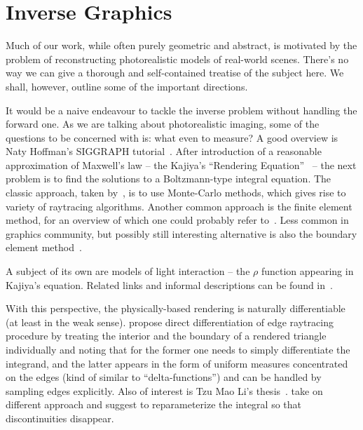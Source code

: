 \chapter{Inverse Graphics} \label{chap:graphics}

Much of our work, while often purely geometric and abstract, is motivated by
the problem of reconstructing photorealistic models of real-world scenes.
There's no way we can give a thorough and self-contained treatise of the subject
here. We shall, however, outline some of the important directions.

It would be a naive endeavour to tackle the inverse problem without handling
the forward one. As we are talking about photorealistic imaging, some of the
questions to be concerned with is: what even to measure?  A good overview is
Naty Hoffman's SIGGRAPH tutorial~\cite{natyHoffmanPBS}. After introduction of a
reasonable approximation of Maxwell's law -- the Kajiya's ``Rendering
Equation''~\cite{kajiya1986rendering} -- the next problem is to find the
solutions to a Boltzmann-type integral equation.
The classic approach, taken by~\cite{kajiya1986rendering},
is to use Monte-Carlo methods, which gives rise to variety of raytracing algorithms.
Another common approach is the finite element method, for an overview of which
one could probably refer to~\cite{lehtinen2004foundations}. Less common in
graphics community, but possibly still interesting alternative is also the boundary element
method~\cite{zhang2013fast}.

A subject of its own are models of light interaction -- the \( \rho \) function
appearing in Kajiya's equation. Related links and informal descriptions
can be found
in~\cite{hackmdRendering,hackmd3d,hackmdBeyondLambert,hackmdBlinn,hackmdDRM,hackmdTorranceSparrow,hackmdPhong}.

With this perspective, the physically-based rendering is naturally
differentiable (at least in the weak sense). \citet{tzuMaoEdgesampling} propose
direct differentiation of edge raytracing procedure by treating the interior
and the boundary of a rendered triangle individually and noting that for the
former one needs to simply differentiate the integrand, and the latter appears
in the form of uniform measures concentrated on the edges (kind of similar to
``delta-functions'') and can be handled by sampling edges explicitly.
Also of interest is Tzu Mao Li's thesis~\cite{tzuMaoThesis}.
\citet{mitsuba2,mitsuba2Math} take on different approach and suggest to
reparameterize the integral so that discontinuities disappear.

